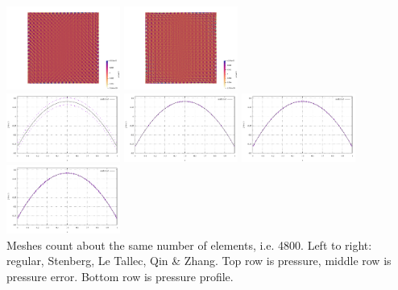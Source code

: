 \begin{center}
\includegraphics[width=3.74cm]{python_codes/fieldstone_78/results/mms/p_error_2}
\includegraphics[width=3.74cm]{python_codes/fieldstone_78/results/mms/p_error_3}\\
\includegraphics[width=3.74cm]{python_codes/fieldstone_78/results/mms/pressure0}
\includegraphics[width=3.74cm]{python_codes/fieldstone_78/results/mms/pressure1}
\includegraphics[width=3.74cm]{python_codes/fieldstone_78/results/mms/pressure2}
\includegraphics[width=3.74cm]{python_codes/fieldstone_78/results/mms/pressure3}\\
{\captionfont Meshes count about the same number of elements, i.e. 4800. 
Left to right: regular, Stenberg, Le Tallec, Qin \& Zhang. Top row is pressure, 
middle row is pressure error. Bottom row is pressure profile.} 
\end{center}



